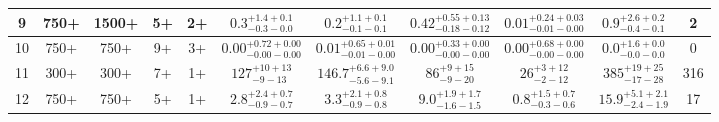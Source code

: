 \documentclass[11pt, oneside]{article}
\begin{document}
\begin{table}
{\begin{tabular}{ |c|c|c|c|c||c|c|c|c||c|c| }
9 & 750+ & 1500+ & 5+ & 2+ & $0.3^{+1.4+0.1}_{-0.3-0.0}$ & $0.2^{+1.1+0.1}_{-0.1-0.1}$ & $0.42^{+0.55+0.13}_{-0.18-0.12}$ & $0.01^{+0.24+0.03}_{-0.01-0.00}$ & $0.9^{+2.6+0.2}_{-0.4-0.1}$ & 2 \\ \hline
10 & 750+ & 750+ & 9+ & 3+ & $0.00^{+0.72+0.00}_{-0.00-0.00}$ & $0.01^{+0.65+0.01}_{-0.01-0.00}$ & $0.00^{+0.33+0.00}_{-0.00-0.00}$ & $0.00^{+0.68+0.00}_{-0.00-0.00}$ & $0.0^{+1.6+0.0}_{-0.0-0.0}$ & 0 \\ \hline
11 & 300+ & 300+ & 7+ & 1+ & $127^{+10+13}_{- 9-13}$ & $146.7^{+6.6+9.0}_{-5.6-9.1}$ & $86^{+ 9+15}_{- 9-20}$ & $26^{+ 3+12}_{- 2-12}$ & $385^{+19+25}_{-17-28}$ & 316 \\ \hline
12 & 750+ & 750+ & 5+ & 1+ & $2.8^{+2.4+0.7}_{-0.9-0.7}$ & $3.3^{+2.1+0.8}_{-0.9-0.8}$ & $9.0^{+1.9+1.7}_{-1.6-1.5}$ & $0.8^{+1.5+0.7}_{-0.3-0.6}$ & $15.9^{+5.1+2.1}_{-2.4-1.9}$ & 17 \\ \hline
\end{tabular}}
\end{table}
\end{document}
